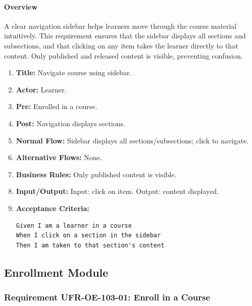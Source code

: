 \paragraph{Overview}
A clear navigation sidebar helps learners move through the course material intuitively. This requirement ensures that the sidebar displays all sections and subsections, and that clicking on any item takes the learner directly to that content. Only published and released content is visible, preventing confusion.
\begin{enumerate}[label=\textbf{\arabic*.}]
\item \textbf{Title:} Navigate course using sidebar.
\item \textbf{Actor:} Learner.
\item \textbf{Pre:} Enrolled in a course.
\item \textbf{Post:} Navigation displays sections.
\item \textbf{Normal Flow:} Sidebar displays all sections/subsections; click to navigate.
\item \textbf{Alternative Flows:} None.
\item \textbf{Business Rules:} Only published content is visible.
\item \textbf{Input/Output:} Input: click on item. Output: content displayed.
\item \textbf{Acceptance Criteria:}
    \begin{verbatim}
Given I am a learner in a course
When I click on a section in the sidebar
Then I am taken to that section's content
    \end{verbatim}
\end{enumerate}

\subsection{Enrollment Module}
\subsubsection{Requirement UFR-OE-103-01: Enroll in a Course}

